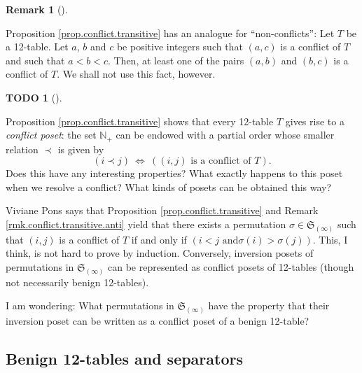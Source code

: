 \documentclass[numbers=enddot,12pt,final,onecolumn,notitlepage]{scrartcl}%
\theoremstyle{definition}
\newtheorem{remk}[theo]{Remark}
\newenvironment{remark}[1][]
{\begin{remk}[#1]\begin{leftbar}}
{\end{leftbar}\end{remk}}
\newtheorem{quest}[theo]{TODO}
\newenvironment{todo}[1][]
{\begin{quest}[#1]\begin{leftbar}}
{\end{leftbar}\end{quest}}
\begin{document}
\begin{remark}
\label{rmk.conflict.transitive.anti}Proposition \ref{prop.conflict.transitive}
has an analogue for \textquotedblleft non-conflicts\textquotedblright: Let $T$
be a 12-table. Let $a$, $b$ and $c$ be positive integers such that $\left(
a,c\right)  $ is a conflict of $T$ and such that $a<b<c$. Then, at least one
of the pairs $\left(  a,b\right)  $ and $\left(  b,c\right)  $ is a conflict
of $T$. We shall not use this fact, however.
\end{remark}

\begin{todo}
Proposition \ref{prop.conflict.transitive} shows that every 12-table $T$ gives
rise to a \textit{conflict poset}: the set $\mathbb{N}_{+}$ can be endowed
with a partial order whose smaller relation $\prec$ is given by%
\[
\left(  i\prec j\right)  \ \Longleftrightarrow\ \left(  \left(  i,j\right)
\text{ is a conflict of }T\right)  .
\]
Does this have any interesting properties? What exactly happens to this poset
when we resolve a conflict? What kinds of posets can be obtained this way?

Viviane Pons says that Proposition \ref{prop.conflict.transitive} and Remark
\ref{rmk.conflict.transitive.anti} yield that there exists a permutation
$\sigma\in\mathfrak{S}_{\left(  \infty\right)  }$ such that $\left(
i,j\right)  $ is a conflict of $T$ if and only if $\left(  i<j\text{ and
}\sigma\left(  i\right)  >\sigma\left(  j\right)  \right)  $. This, I think,
is not hard to prove by induction. Conversely, inversion posets of
permutations in $\mathfrak{S}_{\left(  \infty\right)  }$ can be represented as
conflict posets of 12-tables (though not necessarily benign 12-tables).

I am wondering: What permutations in $\mathfrak{S}_{\left(  \infty\right)  }$
have the property that their inversion poset can be written as a conflict
poset of a benign 12-table?
\end{todo}

\subsection{Benign 12-tables and separators}
\end{document}

